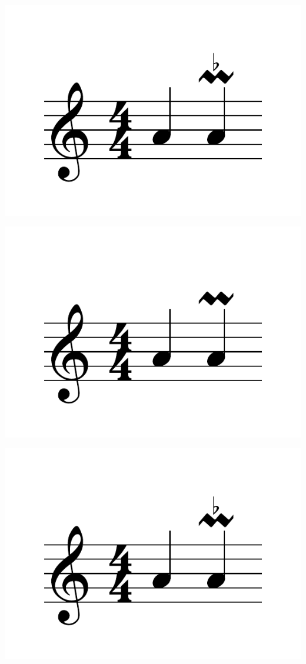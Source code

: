 \documentclass{article}
\begin{document}
\includegraphics[scale=0.5]{figures_tests/pdf/skern/ornaments2.pdf}

\includegraphics[scale=0.5]{figures_tests/pdf/skern/ornaments3.pdf}

\includegraphics[scale=0.5]{figures_tests/pdf/skern/ornaments4.pdf}
\end{document}
